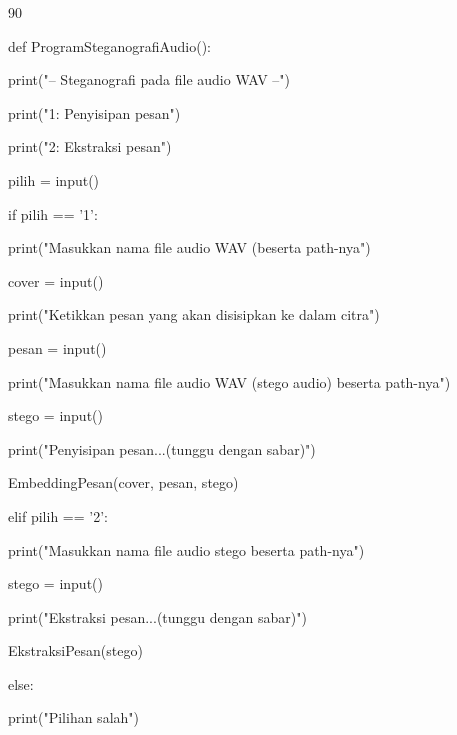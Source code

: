 \documentclass{article}
\begin{document}

90

def ProgramSteganografiAudio():    

    print("-- Steganografi pada file audio WAV --")  

    print("1: Penyisipan pesan")   

    print("2: Ekstraksi pesan")   

    pilih = input()    

    if pilih == '1':       

       print("Masukkan nama file audio WAV (beserta path-nya")       

       cover = input()        

       print("Ketikkan pesan yang akan disisipkan ke dalam citra")       

       pesan = input()       

       print("Masukkan nama file audio WAV (stego audio) beserta path-nya")

       stego = input()      

       print("Penyisipan pesan...(tunggu dengan sabar)")       

       EmbeddingPesan(cover, pesan, stego)   

    elif pilih == '2':        

       print("Masukkan nama file audio stego beserta path-nya")        

       stego = input()        

       print("Ekstraksi pesan...(tunggu dengan sabar)")        

       EkstraksiPesan(stego)   

    else:       

       print("Pilihan salah")
\end{document}
